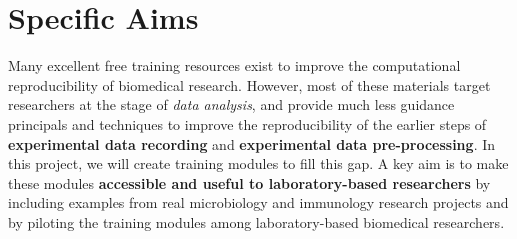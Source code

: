 \documentclass[pdftex,english,11pt,parskip=half]{scrartcl}
\begin{document}
\def\bf{\normalfont\bfseries}
\pagestyle{empty}

\section*{Specific Aims}
\begingroup
    \fontsize{11pt}{12pt}\selectfont 
    
Many excellent free training resources exist to improve the computational reproducibility of biomedical research. However, most of these materials target researchers at the stage of \textit{data analysis}, and provide much less guidance principals and techniques to improve the reproducibility of the earlier steps of \textbf{experimental data recording} and \textbf{experimental data pre-processing}. In this project, we will create training modules to fill this gap. A key aim is to make these modules \textbf{accessible and useful to laboratory-based researchers} by including examples from real microbiology and immunology research projects and by piloting the training modules among laboratory-based biomedical researchers.

\end{document}
